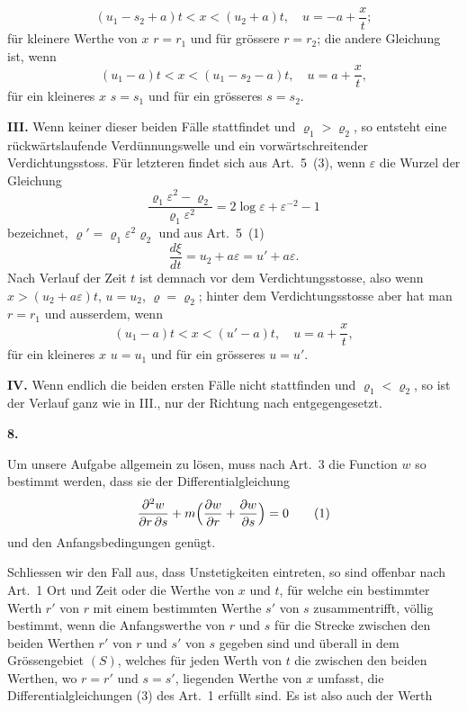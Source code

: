 \documentclass[12pt,a4paper]{book}
\theoremstyle{definition}
\theoremstyle{remark}
\begin{document}
\[
(u_{1} - s_{2} + a)t < x < (u_{2} + a)t,\quad u = -a + \frac{x}{t};
\]
f\"ur kleinere Werthe von $x$ $r = r_{1}$ und f\"ur gr\"ossere $r = r_{2}$; die andere Gleichung ist, wenn
\[
(u_{1} - a)t < x < (u_{1} - s_{2} - a)t,\quad u = a + \frac{x}{t},
\]
f\"ur ein kleineres $x$ $s = s_{1}$ und f\"ur ein gr\"osseres $s = s_{2}$.

\smallskip
\noindent\textbf{III.} Wenn keiner dieser beiden F\"alle stattfindet und $\varrho_{1} > \varrho_{2}$, so entsteht eine r\"uckw\"artslaufende Verd\"unnungswelle und ein vorw\"artschreitender Verdichtungsstoss. F\"ur letzteren findet sich aus Art.~5~(3), wenn $\varepsilon$ die Wurzel der Gleichung
\[
\frac{\varrho_{1}\varepsilon^{2} - \varrho_{2}}{\varrho_{1}\varepsilon^{2}} = 2\log\varepsilon + \varepsilon^{-2} - 1
\]
bezeichnet, $\varrho' = \varrho_{1}\varepsilon^{2}\varrho_{2}$ und aus Art.~5~(1)
\[
\frac{d\xi}{dt} = u_{2} + a\varepsilon = u' + a\varepsilon.
\]
Nach Verlauf der Zeit $t$ ist demnach vor dem Verdichtungsstosse, also wenn $x > (u_{2} + a\varepsilon)t$, $u = u_{2}$, $\varrho = \varrho_{2}$; hinter dem Verdichtungsstosse aber hat man $r = r_{1}$ und ausserdem, wenn
\[
(u_{1} - a)t < x < (u' - a)t,\quad u = a + \frac{x}{t},
\]
f\"ur ein kleineres $x$ $u = u_{1}$ und f\"ur ein gr\"osseres $u = u'$.

\smallskip
\noindent\textbf{IV.} Wenn endlich die beiden ersten F\"alle nicht stattfinden und $\varrho_{1} < \varrho_{2}$, so ist der Verlauf ganz wie in III., nur der Richtung nach entgegengesetzt.

\newpage
\begin{center}
\textbf{8.}
\end{center}

Um unsere Aufgabe allgemein zu l\"osen, muss nach Art.~3 die Function $w$ so bestimmt werden, dass sie der Differentialgleichung
\begin{equation*}
\frac{\partial^{2}w}{\partial r\,\partial s} + m\Bigl(\frac{\partial w}{\partial r} + \frac{\partial w}{\partial s}\Bigr) = 0\tag{1}
\end{equation*}
und den Anfangsbedingungen gen\"ugt.

Schliessen wir den Fall aus, dass Unstetigkeiten eintreten, so sind offenbar nach Art.~1 Ort und Zeit oder die Werthe von $x$ und $t$, f\"ur welche ein bestimmter Werth $r'$ von $r$ mit einem bestimmten Werthe $s'$ von $s$ zusammentrifft, v\"ollig bestimmt, wenn die Anfangswerthe von $r$ und $s$ f\"ur die Strecke zwischen den beiden Werthen $r'$ von $r$ und $s'$ von $s$ gegeben sind und \"uberall in dem Gr\"ossengebiet $(S)$, welches f\"ur jeden Werth von $t$ die zwischen den beiden Werthen, wo $r = r'$ und $s = s'$, liegenden Werthe von $x$ umfasst, die Differentialgleichungen (3) des Art.~1 erf\"ullt sind. Es ist also auch der Werth
\end{document}
